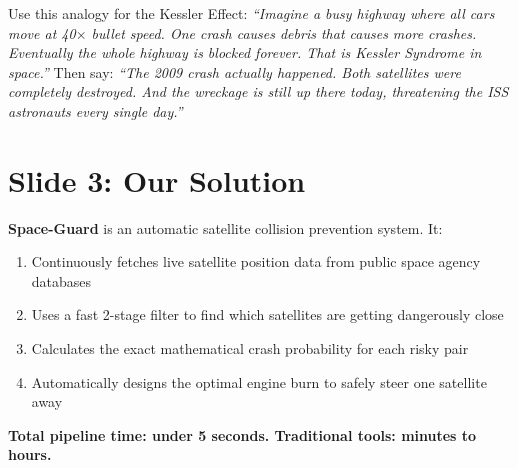 \documentclass[11pt,a4paper]{article}
\begin{document}
\begin{presenterbox}
Use this analogy for the Kessler Effect: \textit{``Imagine a busy highway where all cars move at 40$\times$ bullet speed. One crash causes debris that causes more crashes. Eventually the whole highway is blocked forever. That is Kessler Syndrome in space.''} Then say: \textit{``The 2009 crash actually happened. Both satellites were completely destroyed. And the wreckage is still up there today, threatening the ISS astronauts every single day.''}
\end{presenterbox}

\newpage
\section{Slide 3: Our Solution}

\begin{solutionbox}
\textbf{Space-Guard} is an automatic satellite collision prevention system. It:
\begin{enumerate}[leftmargin=1.5em, itemsep=2pt]
  \item Continuously fetches live satellite position data from public space agency databases
  \item Uses a fast 2-stage filter to find which satellites are getting dangerously close
  \item Calculates the exact mathematical crash probability for each risky pair
  \item Automatically designs the optimal engine burn to safely steer one satellite away
\end{enumerate}
\textbf{Total pipeline time: under 5 seconds. Traditional tools: minutes to hours.}
\end{solutionbox}

\vspace{0.8em}
\end{document}
